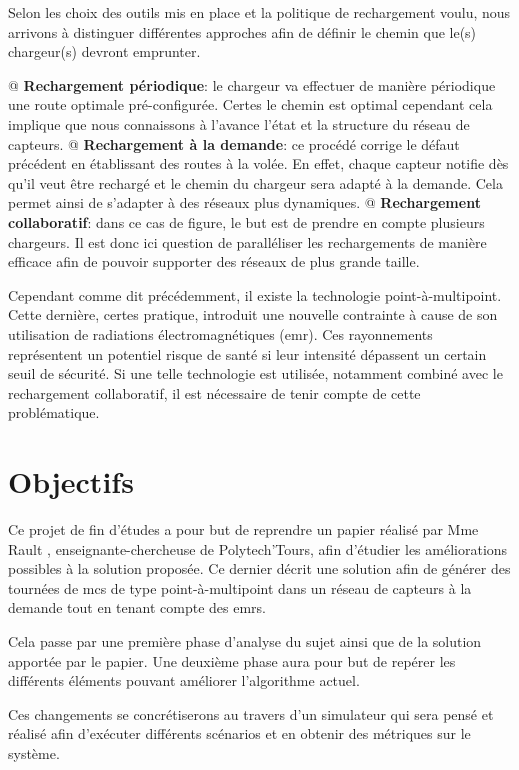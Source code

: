 \documentclass[final]{polytech/polytech}
\begin{document}
		Selon les choix des outils mis en place et la politique de rechargement voulu, nous arrivons à distinguer différentes approches afin de définir le chemin que le(s) chargeur(s) devront emprunter.
		\begin{easylist}[itemize]
			@ \textbf{Rechargement périodique}: le chargeur va effectuer de manière périodique une route optimale pré-configurée.
			Certes le chemin est optimal cependant cela implique que nous connaissons à l'avance l'état et la structure du réseau de capteurs.
			@ \textbf{Rechargement à la demande}: ce procédé corrige le défaut précédent en établissant des routes à la volée.
			En effet, chaque capteur notifie dès qu'il veut être rechargé et le chemin du chargeur sera adapté à la demande.
			Cela permet ainsi de s'adapter à des réseaux plus dynamiques.
			@ \textbf{Rechargement collaboratif}: dans ce cas de figure, le but est de prendre en compte plusieurs chargeurs.
			Il est donc ici question de paralléliser les rechargements de manière efficace afin de pouvoir supporter des réseaux de plus grande taille. 
		\end{easylist}
	
		Cependant comme dit précédemment, il existe la technologie point-à-multipoint.
		Cette dernière, certes pratique, introduit une nouvelle contrainte à cause de son utilisation de radiations électromagnétiques (\gls{emr}).
		Ces rayonnements représentent un potentiel risque de santé si leur intensité dépassent un certain seuil de sécurité.
		Si une telle technologie est utilisée, notamment combiné avec le rechargement collaboratif, il est nécessaire de tenir compte de cette problématique.
		
	\section{Objectifs}
		Ce projet de fin d'études a pour but de reprendre un papier réalisé par Mme Rault \cite{Rault:chargers}, enseignante-chercheuse de Polytech'Tours, afin d'étudier les améliorations possibles à la solution proposée.
		Ce dernier décrit une solution afin de générer des tournées de \glspl{mc} de type point-à-multipoint dans un réseau de capteurs à la demande tout en tenant compte des \glspl{emr}.
		
		Cela passe par une première phase d'analyse du sujet ainsi que de la solution apportée par le papier.
		Une deuxième phase aura pour but de repérer les différents éléments pouvant améliorer l'algorithme actuel.
		
		Ces changements se concrétiserons au travers d'un simulateur qui sera pensé et réalisé afin d'exécuter différents scénarios et en obtenir des métriques sur le système.
	
\end{document}
